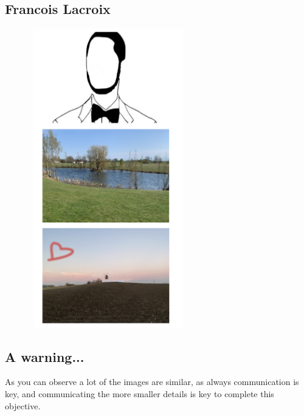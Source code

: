 \documentclass{article}
\begin{document}
\subsection*{Francois Lacroix}
\includegraphics[width=9cm,height=13cm]{Francois_Lacroix.png}

\subsection*{A warning...}
As you can observe a lot of the images are similar, as always communication is key, and communicating the more smaller details is key to complete this objective.
\end{document}
